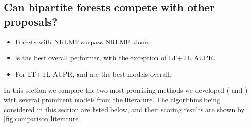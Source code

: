 \subsection{Can bipartite forests compete with other proposals?}
\label{sec:comparison literature}

\begin{mdframed}[frametitle={Key findings}]
    \begin{itemize}
        \item Forests with NRLMF surpass NRLMF alone.
        \item {} is the best overall performer, with the exception of LT+TL AUPR. 
        \item For LT+TL AUPR,  and  are the best models overall.
    \end{itemize}
\end{mdframed}

In this section we compare the two most promising methods we developed ( and ) with several prominent models from the literature. 
%
The algorithms being considered in this section are listed below, and their scoring results are shown by \autoref{fig:comparison literature}.

